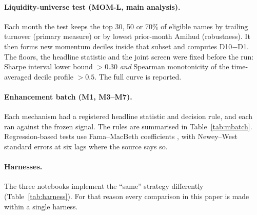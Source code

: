 \documentclass[11pt]{article}
\begin{document}
\paragraph{Liquidity-universe test (MOM-L, main analysis).} Each month the test keeps
the top 30, 50 or 70\% of eligible names by trailing turnover (primary measure) or by
lowest prior-month Amihud (robustness). It then forms new momentum deciles inside that
subset and computes D10$-$D1. The floors, the headline statistic and the joint screen
were fixed before the run: Sharpe interval lower bound $>0.30$ \emph{and} Spearman
monotonicity of the time-averaged decile profile $>0.5$. The full curve is reported.

\paragraph{Enhancement batch (M1, M3--M7).} Each mechanism had a registered headline
statistic and decision rule, and each ran against the frozen signal. The rules are
summarised in Table~\ref{tab:mbatch}. Regression-based tests use Fama--MacBeth
coefficients \citep{fama1973}, with Newey--West standard errors at six lags
\citep{newey1987} where the source says so.

\paragraph{Harnesses.} The three notebooks implement the ``same'' strategy differently
(Table~\ref{tab:harness}). For that reason every comparison in this paper is made within
a single harness.
\end{document}
